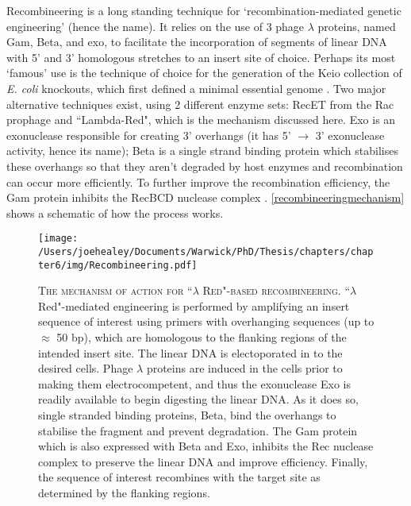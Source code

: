 Recombineering is a long standing technique for `recombination-mediated genetic engineering' (hence the name). It relies on the use of 3 phage $\lambda$ proteins, named Gam, Beta, and exo, to facilitate the incorporation of segments of linear DNA with 5' and 3' homologous stretches to an insert site of choice. Perhaps its most `famous' use is the technique of choice for the generation of the Keio collection of \emph{E. coli} knockouts, which first defined a minimal essential genome \citep{Baba2006}. Two major alternative techniques exist, using 2 different enzyme sets: RecET from the Rac prophage and ``Lambda-Red", which is the mechanism discussed here. Exo is an exonuclease responsible for creating 3' overhangs (it has 5' $\rightarrow$ 3' exonuclease activity, hence its name); Beta is a single strand binding protein which stabilises these overhangs so that they aren't degraded by host enzymes and recombination can occur more efficiently. To further improve the recombination efficiency, the Gam protein inhibits the RecBCD nuclease complex \citep{Yu2000}. \vref{recombineeringmechanism} shows a schematic of how the process works.


\begin{figure}[p]

    \texttt{[image: /Users/joehealey/Documents/Warwick/PhD/Thesis/chapters/chapter6/img/Recombineering.pdf]}
    \captionsetup{singlelinecheck=off, justification=justified, font=footnotesize, aboveskip=10pt}
    \caption[Recombineering mechanism of action]{\textsc{\normalsize The mechanism of action for ``$\lambda$ Red"-based recombineering.} \vspace{0.1cm} \newline ``$\lambda$ Red"-mediated engineering is performed by amplifying an insert sequence of interest using primers with overhanging sequences (up to $\approx$ 50 bp), which are homologous to the flanking regions of the intended insert site. The linear DNA is electoporated in to the desired cells. Phage $\lambda$ proteins are induced in the cells prior to making them electrocompetent, and thus the exonuclease Exo is readily available to begin digesting the linear DNA. As it does so, single stranded binding proteins, Beta, bind the overhangs to stabilise the fragment and prevent degradation. The Gam protein which is also expressed with Beta and Exo, inhibits the Rec nuclease complex to preserve the linear DNA and improve efficiency. Finally, the sequence of interest recombines with the target site as determined by the flanking regions.}
\label{recombineeringmechanism}
\end{figure}


